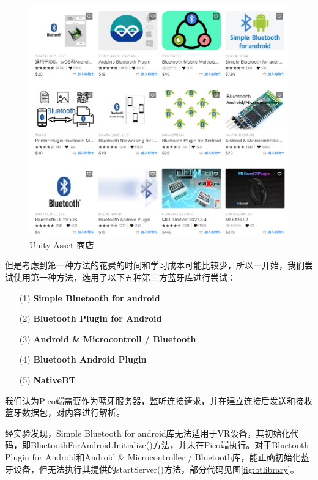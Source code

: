 \documentclass[a4paper,10pt]{article}
\begin{document}
		\begin{figure}[htbp]
			\centering
			\includegraphics[width=0.5\linewidth]{picture/Unity Asset}
			\caption{Unity Asset 商店}
			\label{fig:unity-asset}
		\end{figure}
		
		但是考虑到第一种方法的花费的时间和学习成本可能比较少，所以一开始，我们尝试使用第一种方法，选用了以下五种第三方蓝牙库进行尝试：
		
		\begin{itemize}
			\item[(1)] \textbf{Simple Bluetooth for android}
			\item[(2)] \textbf{Bluetooth Plugin for Android}
			\item[(3)] \textbf{Android \& Microcontroll / Bluetooth}
			\item[(4)] \textbf{Bluetooth Android Plugin}
			\item[(5)] \textbf{NativeBT}
		\end{itemize}
		
		我们认为Pico端需要作为蓝牙服务器，监听连接请求，并在建立连接后发送和接收蓝牙数据包，对内容进行解析。
		
		经实验发现，Simple Bluetooth for android库无法适用于VR设备，其初始化代码，即BluetoothForAndroid.Initialize()方法，并未在Pico端执行。对于Bluetooth Plugin for Android和Android \& Microcontroller / Bluetooth库，能正确初始化蓝牙设备，但无法执行其提供的startServer()方法，部分代码见图\ref{fig:btlibrary}。
		
\end{document}
